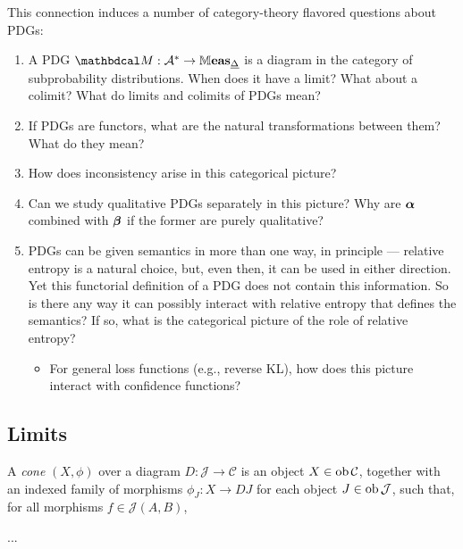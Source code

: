 This connection induces a number of category-theory flavored questions about PDGs:
\begin{enumerate}
    \item A PDG $\dg M : \mathcal A^* \to \Meas_{\underline\Delta}$ is a diagram in the category of subprobability distributions. When does it have a limit? What about a colimit? What do limits and colimits of PDGs mean? 

    \item If PDGs are functors, what are the natural transformations between them? What do they mean? 
    \item How does inconsistency arise in this categorical picture? 
    \item Can we study qualitative PDGs separately in this picture? Why are $\boldsymbol\alpha$ combined with $\boldsymbol\beta$ if the former are purely qualitative? 
    
    
    \item 
    PDGs can be given semantics in more than one way, in principle --- relative entropy is a natural choice, but, even then, it can be used in either direction.  Yet this functorial definition of a PDG does not contain this information.
    So is there any way it can possibly interact with relative entropy that defines the semantics? 
    If so, what is the categorical picture of the role of relative entropy?
    \begin{itemize}
        \item For general loss functions (e.g., reverse KL),
         how does this picture interact with confidence functions?  
    \end{itemize}
\end{enumerate}



\subsection{Limits}

A \emph{cone} $(X, \phi)$ over a diagram $D : \mathcal J \to \mathcal C$ is an object $X \in \operatorname{\mathop{\mathrm{ob}}} \mathcal C$, together with an indexed family of morphisms $\phi_J : X \to D J$ for each object $J \in \operatorname{\mathop{\mathrm{ob}}} \mathcal J$, such that, for all morphisms $f \in \mathcal J(A,B)$, 

... 
\TODO



